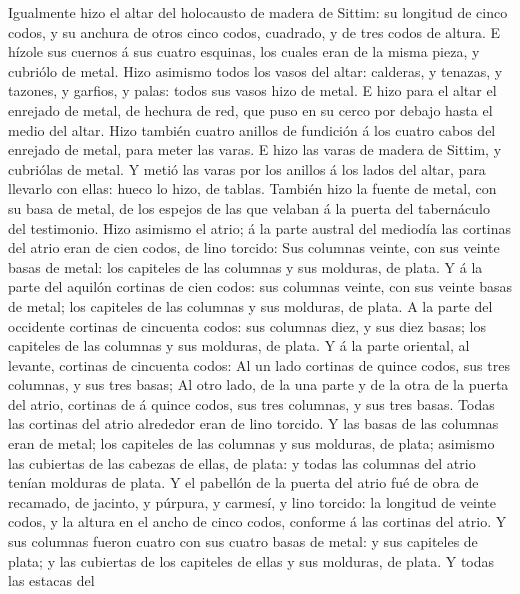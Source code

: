  Igualmente hizo el altar del holocausto de madera de
Sittim: su longitud de cinco codos, y su anchura de otros cinco codos,
cuadrado, y de tres codos de altura.  E hízole sus cuernos á
sus cuatro esquinas, los cuales eran de la misma pieza, y cubriólo de
metal.  Hizo asimismo todos los vasos del altar: calderas, y
tenazas, y tazones, y garfios, y palas: todos sus vasos hizo de metal.
 E hizo para el altar el enrejado de metal, de hechura de
red, que puso en su cerco por debajo hasta el medio del altar.
 Hizo también cuatro anillos de fundición á los cuatro cabos
del enrejado de metal, para meter las varas.  E hizo las
varas de madera de Sittim, y cubriólas de metal.  Y metió
las varas por los anillos á los lados del altar, para llevarlo con
ellas: hueco lo hizo, de tablas.  También hizo la fuente de
metal, con su basa de metal, de los espejos de las que velaban á la
puerta del tabernáculo del testimonio.  Hizo asimismo el
atrio; á la parte austral del mediodía las cortinas del atrio eran de
cien codos, de lino torcido:  Sus columnas veinte, con sus
veinte basas de metal: los capiteles de las columnas y sus molduras, de
plata.  Y á la parte del aquilón cortinas de cien codos:
sus columnas veinte, con sus veinte basas de metal; los capiteles de las
columnas y sus molduras, de plata.  A la parte del
occidente cortinas de cincuenta codos: sus columnas diez, y sus diez
basas; los capiteles de las columnas y sus molduras, de plata.
 Y á la parte oriental, al levante, cortinas de cincuenta
codos:  Al un lado cortinas de quince codos, sus tres
columnas, y sus tres basas;  Al otro lado, de la una parte
y de la otra de la puerta del atrio, cortinas de á quince codos, sus
tres columnas, y sus tres basas.  Todas las cortinas del
atrio alrededor eran de lino torcido.  Y las basas de las
columnas eran de metal; los capiteles de las columnas y sus molduras, de
plata; asimismo las cubiertas de las cabezas de ellas, de plata: y todas
las columnas del atrio tenían molduras de plata.  Y el
pabellón de la puerta del atrio fué de obra de recamado, de jacinto, y
púrpura, y carmesí, y lino torcido: la longitud de veinte codos, y la
altura en el ancho de cinco codos, conforme á las cortinas del atrio.
 Y sus columnas fueron cuatro con sus cuatro basas de
metal: y sus capiteles de plata; y las cubiertas de los capiteles de
ellas y sus molduras, de plata.  Y todas las estacas del
